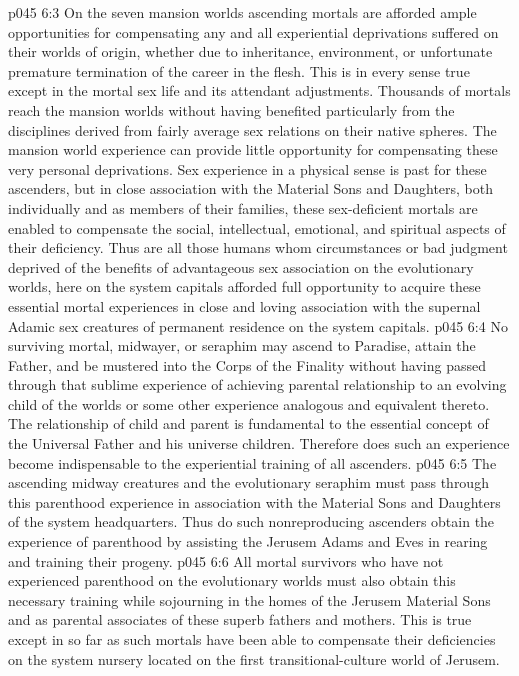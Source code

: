 \vs p045 6:3 On the seven mansion worlds ascending mortals are afforded ample opportunities for compensating any and all experiential deprivations suffered on their worlds of origin, whether due to inheritance, environment, or unfortunate premature termination of the career in the flesh. This is in every sense true except in the mortal sex life and its attendant adjustments. Thousands of mortals reach the mansion worlds without having benefited particularly from the disciplines derived from fairly average sex relations on their native spheres. The mansion world experience can provide little opportunity for compensating these very personal deprivations. Sex experience in a physical sense is past for these ascenders, but in close association with the Material Sons and Daughters, both individually and as members of their families, these sex\hyp{}deficient mortals are enabled to compensate the social, intellectual, emotional, and spiritual aspects of their deficiency. Thus are all those humans whom circumstances or bad judgment deprived of the benefits of advantageous sex association on the evolutionary worlds, here on the system capitals afforded full opportunity to acquire these essential mortal experiences in close and loving association with the supernal Adamic sex creatures of permanent residence on the system capitals.
\vs p045 6:4 \pc No surviving mortal, midwayer, or seraphim may ascend to Paradise, attain the Father, and be mustered into the Corps of the Finality without having passed through that sublime experience of achieving parental relationship to an evolving child of the worlds or some other experience analogous and equivalent thereto. The relationship of child and parent is fundamental to the essential concept of the Universal Father and his universe children. Therefore does such an experience become indispensable to the experiential training of all ascenders.
\vs p045 6:5 The ascending midway creatures and the evolutionary seraphim must pass through this parenthood experience in association with the Material Sons and Daughters of the system headquarters. Thus do such nonreproducing ascenders obtain the experience of parenthood by assisting the Jerusem Adams and Eves in rearing and training their progeny.
\vs p045 6:6 All mortal survivors who have not experienced parenthood on the evolutionary worlds must also obtain this necessary training while sojourning in the homes of the Jerusem Material Sons and as parental associates of these superb fathers and mothers. This is true except in so far as such mortals have been able to compensate their deficiencies on the system nursery located on the first transitional\hyp{}culture world of Jerusem.
